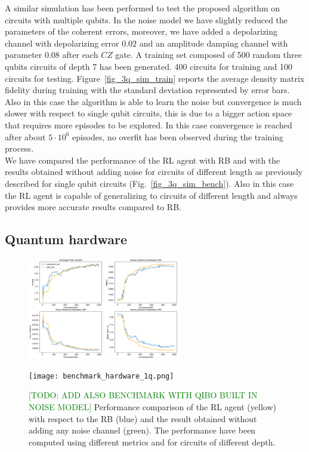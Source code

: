 \documentclass[referee,sn-basic]{sn-jnl} %
\newcommand{\todo}[1]{\textcolor{green}{[TODO: #1]}}
\begin{document}
\noindent
A similar simulation has been performed to test the proposed algorithm on circuits with multiple qubits. In the noise model we have slightly reduced the parameters of the coherent errors, moreover, we have added a depolarizing channel with depolarizing error $0.02$ and an amplitude damping channel with parameter $0.08$ after each $CZ$ gate. A training set composed of 500 random three qubits circuits of depth 7 has been generated. 400 circuits for training and 100 circuits for testing. Figure~\ref{fig_3q_sim_train} reports the average density matrix fidelity during training with the standard deviation represented by error bars.
Also in this case the algorithm is able to learn the noise but convergence is much slower with respect to single qubit circuits, this is due to a bigger action space that requires more episodes to be explored. In this case convergence is reached after about $5\cdot10^6$ episodes, no overfit has been observed during the training process.\\
We have compared the performance of the RL agent with RB and with the results obtained without adding noise for circuits of different length as previously described for single qubit circuits (Fig.~\ref{fig_3q_sim_bench}). Also in this case the RL agent is capable of generalizing to circuits of different length and always provides more accurate results compared to RB. 

\subsection{Quantum hardware}\label{sec_hardware}
\begin{figure}
    \centering
    \includegraphics[width=0.6\textwidth]{training_hardware_1q.png}
    \caption{\todo{
    - REDUCE METRICS\\
    - EPISODES ON X-AXIS\\
    - CORRECT NAME OF PLOTS\\
    - ADD ERRORS AS VIOLIN PLOT OR CONFIDENCE INTERVAL}\\
    Average final reward and other evaluation metrics during training for one qubit circuits executed on quantum hardware.}\label{fig_1q_hard_train}
    \texttt{[image: benchmark\_hardware\_1q.png]}
    \caption{\todo{ADD ALSO BENCHMARK WITH QIBO BUILT IN NOISE MODEL}
    Performance comparison of the RL agent (yellow) with respect to the RB (blue) and the result obtained without adding any noise channel (green). The performance have been computed using different metrics and for circuits of different depth.}\label{fig_1q_hard_bench}
\end{figure}
\end{document}
